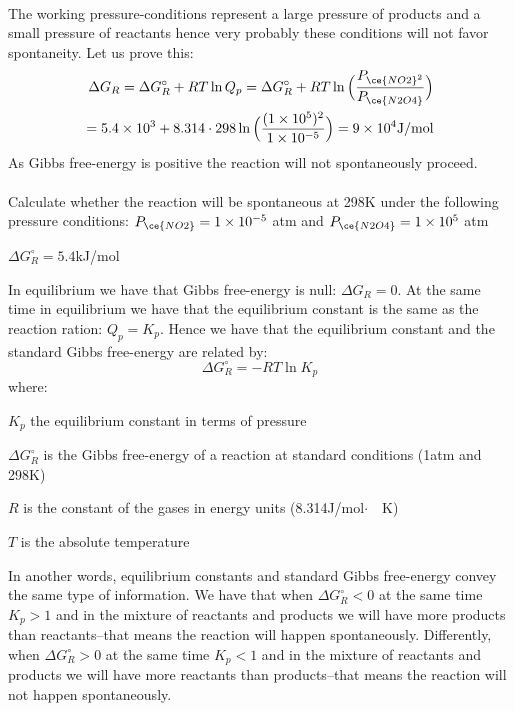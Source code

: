 \documentclass[main.tex]{subfiles}
\newcommand\chapterlabel{entropy}
\begin{document}
\begin{description}
\begin{example}
\\
The working pressure-conditions represent a large pressure of products and a small pressure of reactants hence very probably these conditions will not favor spontaneity. Let us prove this:
\begin{equation*}\begin{split}  \Delta G_R= \Delta G^{\circ}_R + RT\ln Q_p=   \Delta G^{\circ}_R + RT\ln \Big( \frac{P_{\ce{NO2}^2}}	{P_{\ce{N2O4}}} \Big)\hfill \text{}\\
 \hfill =  5.4\times 10^3 +8.314\cdot 298 \ln \Big( \frac{ (1\times 10^{5})^2}{1\times 10^{-5}} \Big) =9\times 10^4 \text{J/mol}\end{split}\end{equation*} 
As Gibbs free-energy is positive the reaction will not spontaneously proceed.\\
\faDiamond\ \\
Calculate whether the reaction will be spontaneous at 298K under the following pressure conditions: $P_{\ce{NO2}}=1\times 10^{-5}$ atm and $P_{\ce{N2O4}}=1\times 10^{5}$ atm 
\begin{center}\hfill $\Delta G^{\circ}_R=5.4$kJ/mol\end{center}
\end{example}%

\item[\docfilehook{Relationship between $\Delta G^{\circ}_R$ and $K_p$}{ }] In equilibrium we have that Gibbs free-energy is null: $\Delta G_R=0$. At the same time in equilibrium we have that the equilibrium constant is the same as the reaction ration: $Q_p=K_p$. Hence we have that the equilibrium constant and the standard Gibbs free-energy are related by:
\begin{equation}
\boxed{ \Delta G^{\circ}_R =-RT\ln K_p	}\label{\chapterlabel:equation12}
\end{equation}
where:
\begin{where}
 \item $K_p$   the equilibrium constant in terms of pressure
 \item $\Delta G^{\circ}_R$   is the Gibbs free-energy of a reaction at standard conditions (1atm and 298K)
 \item $R$  is the constant of the gases in energy units (8.314J/mol$\cdot\text{ }$  K)
  \item $T$  is the absolute temperature
\end{where}
In another words, equilibrium constants and standard Gibbs free-energy convey the same type of information. We have that when $\Delta G^{\circ}_R<0$ at the same time $K_p>1$ and in the mixture of reactants and products we will have more products than reactants--that means the reaction will happen spontaneously. Differently, when $\Delta G^{\circ}_R>0$ at the same time $K_p<1$ and in the mixture of reactants and products we will have more reactants than products--that means the reaction will not happen spontaneously.


\end{description}
\end{document}

